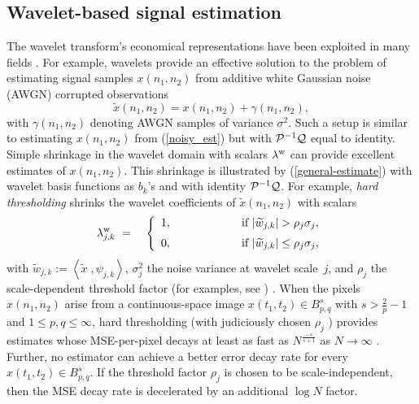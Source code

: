 \documentclass[11pt]{article}
\def\nnnx {n_1}
\def\nnny {n_2}
\def\nnbothk {k}
\def\tttx {t_1}
\def\ttty {t_2}
\def\cP { {\cal{P}} }
\def\cQ { {\cal{Q}} }
\begin{document}
\subsection{Wavelet-based signal estimation}
\label{sect:wavesigest}
The wavelet transform's economical representations have been exploited
in many fields \cite{mallat-new}. For example, wavelets provide an
effective solution to the problem of estimating signal samples
$x(\nnnx,\nnny)$ from additive white Gaussian noise (AWGN) corrupted
observations\cite{donoho-minimax,donoho99asymptotic,Donoho1}
\begin{equation}
\widetilde{x}(\nnnx,\nnny) = x(\nnnx,\nnny) + \gamma(\nnnx,\nnny),
\label{whitenoisesetup}
\end{equation} 
with $\gamma(\nnnx,\nnny)$ denoting AWGN samples of variance
$\sigma^2$.  Such a setup is similar to estimating $x(\nnnx,\nnny)$
from (\ref{noisy_est}) but with $\cP^{-1}\cQ$ equal to
identity. Simple shrinkage in the wavelet domain with scalars
$\lambda^{\rm w}$ can provide excellent estimates of
$x(\nnnx,\nnny)$. This shrinkage is illustrated by
(\ref{general-estimate}) with wavelet basis functions as $b_k$'s and
with identity $\cP^{-1}\cQ$. For example, {\em hard thresholding}
shrinks the wavelet coefficients of $\widetilde{x}(\nnnx,\nnny)$ with
scalars
\begin{eqnarray}
\lambda^{\rm w}_{j,\nnbothk} ~&=&~ \left\{\begin{array}{ll} 1,
~~~~~~~~~~~~~~~& \mbox{ if
$ |\widetilde{w}_{j,\nnbothk}|>
\rho_j\sigma_{j}$},\\[2mm] 0, ~~~~~~~~~~~~~~~& \mbox{ if
$ |\widetilde{w}_{j,\nnbothk}|\le
\rho_j\sigma_{j}$},\end{array} \right.
\label{hardthresholding}
\end{eqnarray}
with $\widetilde{w}_{j,\nnbothk} :=
\left\langle\widetilde{x}\;,\psi_{j,\nnbothk}\right\rangle$,
$\sigma_{j}^2$ the noise variance at wavelet scale~$j$, and $\rho_j$
the scale-dependent threshold factor (for examples, see \cite[p.\
442]{mallat-new}) . When the pixels $x(\nnnx,\nnny)$ arise from a
continuous-space image $x(\tttx,\ttty) \in B_{p,q}^{s}$ with $s >
\frac{2}{p} - 1$ and $ 1 \le p,q \le \infty$, hard thresholding (with
judiciously chosen $\rho_j$ \cite{donoho-minimax}) provides estimates
whose MSE-per-pixel decays at least as fast as $N^{\frac{-s}{s+1}}$ as
$N \rightarrow \infty$ \cite{donoho99asymptotic,Donoho1}. Further, no
estimator can achieve a better error decay rate for every
$x(\tttx,\ttty) \in B_{p,q}^{s}$. If the threshold factor $\rho_j$ is
chosen to be scale-independent, then the MSE decay rate is decelerated
by an additional $\log{N}$ factor.
\end{document}
